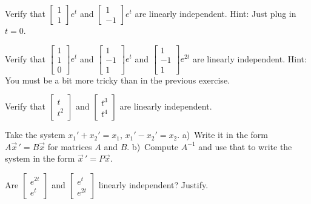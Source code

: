 \documentclass[12pt]{book}
\begin{document}
\begin{exercise}
Verify that
$\left[ \begin{smallmatrix}
1 \\ 1
\end{smallmatrix} \right] e^{t}$ and
$\left[ \begin{smallmatrix}
1 \\ -1
\end{smallmatrix} \right] e^{t}$ 
are linearly independent.  Hint: Just plug in $t=0$.
\end{exercise}

\begin{exercise}
Verify that
$\left[ \begin{smallmatrix}
1 \\ 1 \\ 0
\end{smallmatrix} \right] e^{t}$ and
$\left[ \begin{smallmatrix}
1 \\ -1 \\ 1
\end{smallmatrix} \right] e^{t}$ 
and
$\left[ \begin{smallmatrix}
1 \\ -1 \\ 1
\end{smallmatrix} \right] e^{2t}$ 
are linearly independent.  Hint: You must be a bit more tricky than in the
previous exercise.
\end{exercise}

\begin{exercise}
Verify that
$\left[ \begin{smallmatrix}
t \\ t^2
\end{smallmatrix} \right]$ and
$\left[ \begin{smallmatrix}
t^3 \\ t^4
\end{smallmatrix} \right]$ 
are linearly independent.
\end{exercise}

\begin{exercise}
Take the system $x_1' + x_2' = x_1$,
$x_1' - x_2' = x_2$.
a)~Write it in the form
$A {\vec{x}\,}' = B \vec{x}$ for matrices $A$ and $B$.
b)~Compute $A^{-1}$ and use that to write the system in the form
${\vec{x}\,}' = P \vec{x}$.
\end{exercise}

\setcounter{exercise}{100}

\begin{exercise}
Are
$\left[ \begin{smallmatrix}
e^{2t} \\ e^t
\end{smallmatrix}\right]$
and
$\left[ \begin{smallmatrix}
e^{t} \\ e^{2t}
\end{smallmatrix}\right]$
linearly independent?  Justify.
\end{exercise}
\end{document}
